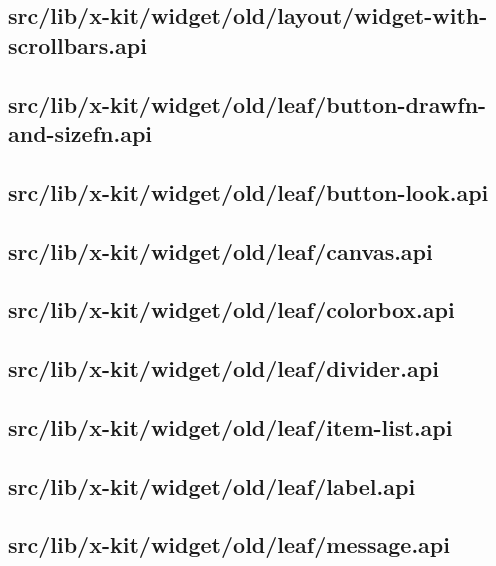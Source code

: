 \subsection{src/lib/x-kit/widget/old/layout/widget-with-scrollbars.api}


\subsection{src/lib/x-kit/widget/old/leaf/button-drawfn-and-sizefn.api}


\subsection{src/lib/x-kit/widget/old/leaf/button-look.api}


\subsection{src/lib/x-kit/widget/old/leaf/canvas.api}


\subsection{src/lib/x-kit/widget/old/leaf/colorbox.api}


\subsection{src/lib/x-kit/widget/old/leaf/divider.api}


\subsection{src/lib/x-kit/widget/old/leaf/item-list.api}


\subsection{src/lib/x-kit/widget/old/leaf/label.api}


\subsection{src/lib/x-kit/widget/old/leaf/message.api}


